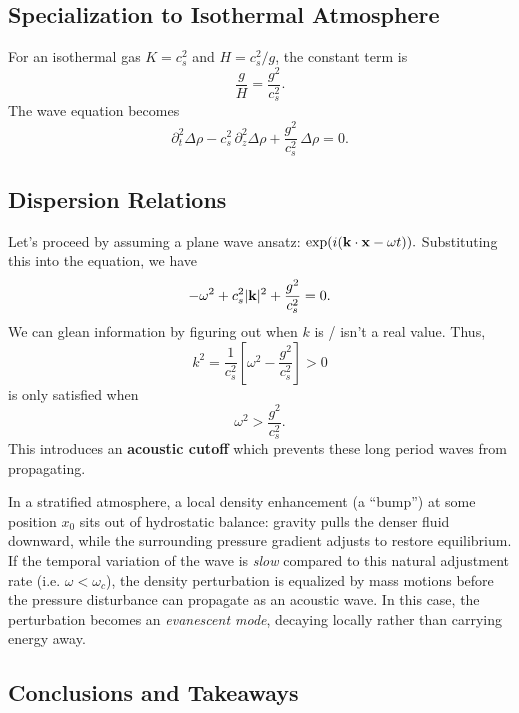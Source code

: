 \subsection*{Specialization to Isothermal Atmosphere}

For an isothermal gas $K = c_s^2$ and $H = c_s^2/g$, the constant term is
\[
\frac{g}{H} = \frac{g^2}{c_s^2}.
\]
The wave equation becomes
\begin{equation}
\boxed{
\partial_t^2 \Delta\rho - c_s^2\,\partial_z^2 \Delta\rho + \frac{g^2}{c_s^2}\,\Delta\rho = 0
}.
\end{equation}

\subsection*{Dispersion Relations}

Let's proceed by assuming a plane wave ansatz: $\exp(i({\bf k}\cdot{\bf x} - \omega t)).$ Substituting this into the equation, we have
\[
-\omega^2 + c_s^2 |{\bf k}|^2 + \frac{g^2}{c_s^2} = 0.
\]
We can glean information by figuring out when $k$ is / isn't a real value.  Thus,
\[
k^2 = \frac{1}{c_s^2}\left[\omega^2 - \frac{g^2}{c_s^2}\right] > 0
\]
is only satisfied when
\[
\omega^2 > \frac{g^2}{c_s^2}.
\]
This introduces an \textbf{acoustic cutoff} which prevents these long period waves from propagating.
\begin{remark}
    In a stratified atmosphere, a local density enhancement (a ``bump'') at some position $x_0$ sits out of hydrostatic balance: gravity pulls the denser fluid downward, while the surrounding pressure gradient adjusts to restore equilibrium. 
    If the temporal variation of the wave is \emph{slow} compared to this natural adjustment rate (i.e. $\omega < \omega_c$), the density perturbation is equalized by mass motions before the pressure disturbance can propagate as an acoustic wave. 
    In this case, the perturbation becomes an \emph{evanescent mode}, decaying locally rather than carrying energy away.
\end{remark}

\subsection*{Conclusions and Takeaways}

